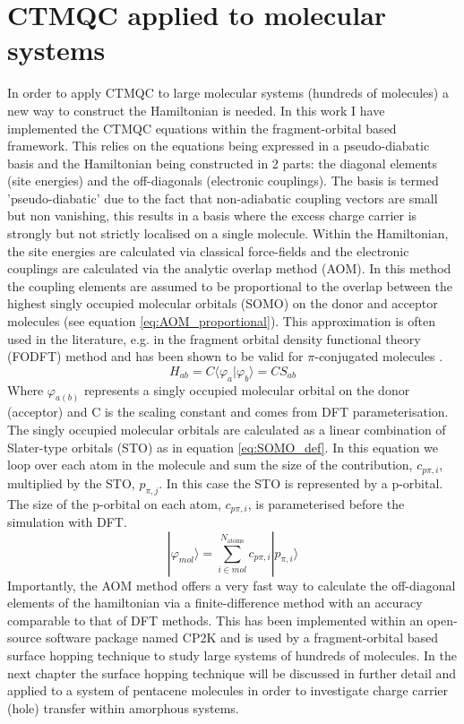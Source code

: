 \chapter{CTMQC applied to molecular systems}
\label{chap:molecular_systems}
In order to apply CTMQC to large molecular systems (hundreds of molecules) a new way to construct the Hamiltonian is needed. In this work I have implemented the CTMQC equations within the fragment-orbital based framework. This relies on the equations being expressed in a pseudo-diabatic basis and the Hamiltonian being constructed in 2 parts: the diagonal elements (site energies) and the off-diagonals (electronic couplings). The basis is termed 'pseudo-diabatic' due to the fact that non-adiabatic coupling vectors are small but non vanishing, this results in a basis where the excess charge carrier is strongly but not strictly localised on a single molecule. Within the Hamiltonian, the site energies are calculated via classical force-fields and the electronic couplings are calculated via the analytic overlap method \cite{gajdos_ultrafast_2014, spencer_fob-sh:_2016} (AOM). In this method the coupling elements are assumed to be proportional to the overlap between the highest singly occupied molecular orbitals (SOMO) on the donor and acceptor molecules (see equation \eqref{eq:AOM_proportional}). This approximation is often used in the literature, e.g. in the fragment orbital density functional theory \cite{KirkpatrickJ2008,C2CP41348E,TroisiA2002} (FODFT) method and has been shown to be valid for $\pi$-conjugated molecules \cite{KubasA2014, gajdos_ultrafast_2014}.
\begin{equation}
  H_{ab} = C \langle \varphi_{a} | \varphi_{b} \rangle = C S_{ab}
  \label{eq:AOM_proportional}
\end{equation}
Where $\varphi_{a(b)}$ represents a singly occupied molecular orbital on the donor (acceptor) and C is the scaling constant and comes from DFT parameterisation. The singly occupied molecular orbitals are calculated as a linear combination of Slater-type orbitals (STO) as in equation  \eqref{eq:SOMO_def}. In this equation we loop over each atom in the molecule and sum the size of the contribution, $c_{p\pi, i}$, multiplied by the STO, $p_{\pi, j}$. In this case the STO is represented by a p-orbital. The size of the p-orbital on each atom, $c_{p\pi, i}$, is parameterised before the simulation with DFT.
\begin{equation}
  | \varphi_{mol} \rangle = \sum_{i \in mol}^{N_{\text{atoms}}} c_{p\pi, i} | p_{\pi, i} \rangle
  \label{eq:SOMO_def}
\end{equation}
Importantly, the AOM method offers a very fast way to calculate the off-diagonal elements of the hamiltonian via a finite-difference method with an accuracy comparable to that of DFT methods. This has been implemented within an open-source software package named CP2K and is used by a fragment-orbital based surface hopping technique to study large systems of hundreds of molecules. In the next chapter the surface hopping technique will be discussed in further detail and applied to a system of pentacene molecules in order to investigate charge carrier (hole) transfer within amorphous systems.


